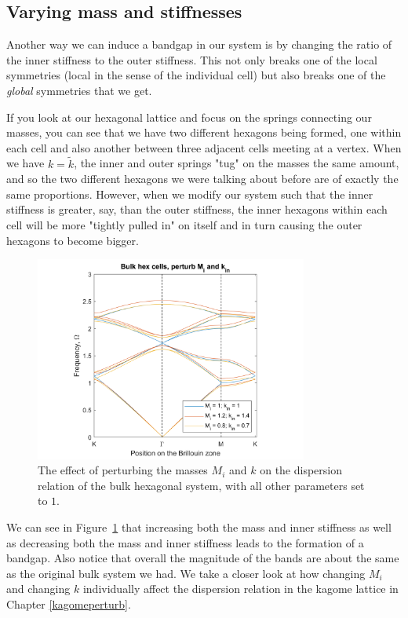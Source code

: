 \subsection{Varying mass and stiffnesses}
Another way we can induce a bandgap in our system is by changing the ratio of
the inner stiffness to the outer stiffness. This not only breaks one of the
local symmetries (local in the sense of the individual cell) but also breaks
one of the \textit{global} symmetries that we get. 

If you look at our hexagonal lattice and focus on the springs connecting our
masses, you can see that we have two different hexagons being formed, one
within each cell and also another between three adjacent cells meeting at a
vertex. When we have $k=\tilde{k}$, the inner and outer springs "tug" on the
masses the same amount, and so the two different hexagons we were talking about
before are of exactly the same proportions. However, when we modify our system
such that the inner stiffness is greater, say, than the outer stiffness, the
inner hexagons within each cell will be more "tightly pulled in" on itself and
in turn causing the outer hexagons to become bigger.

\begin{figure}[!h]
\centering
\includegraphics[width=0.8\textwidth]{imgs/hexperturb2.png}
\caption{\label{fig:hex2} The effect of perturbing the masses $M_i$ and
  $k$ on the dispersion relation of the bulk hexagonal system, with all other
  parameters set to $1$.}
\end{figure}

We can see in Figure~\ref{fig:hex2} that increasing both the mass and inner
stiffness as well as decreasing both the mass and inner stiffness leads to the
formation of a bandgap. Also notice that overall the magnitude of the bands are
about the same as the original bulk system we had. We take a closer look at how
changing $M_i$ and changing $k$ individually affect the dispersion relation in
the kagome lattice in Chapter \ref{kagomeperturb}.

